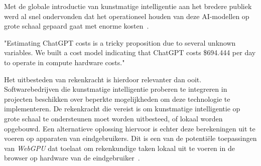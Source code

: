 
Met de globale introductie van kunstmatige intelligentie aan het bredere publiek werd al snel ondervonden dat het operationeel houden van deze AI-modellen op grote schaal gepaard gaat met enorme kosten~\autocite{Patel2023}.

\begin{displayquote}
    "Estimating ChatGPT costs is a tricky proposition due to several unknown variables. We built a cost model indicating that ChatGPT costs \$694.444 per day to operate in compute hardware costs."
\end{displayquote}

Het uitbesteden van rekenkracht is hierdoor relevanter dan ooit. Softwarebedrijven die kunstmatige intelligentie proberen te integreren in projecten beschikken over beperkte mogelijkheden om deze technologie te implementeren. De rekenkracht die vereist is om kunstmatige intelligentie op grote schaal te ondersteunen moet worden uitbesteed, of lokaal worden opgebouwd. Een alternatieve oplossing hiervoor is echter deze berekeningen uit te voeren op apparaten van eindgebruikers. Dit is een van de potentiële toepassingen van \textit{WebGPU} dat toelaat om rekenkundige taken lokaal uit te voeren in de browser op hardware van de eindgebruiker~\autocite{Wallez2023}.

\section{}%
\label{sec:onderzoeksvraag}



